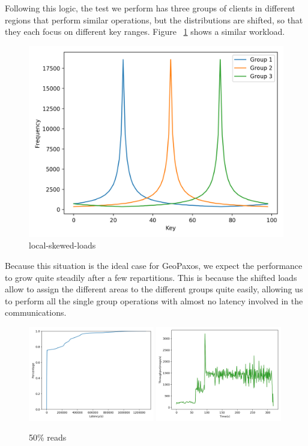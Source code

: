 Following this logic, the test we perform has three groups of clients in different regions that perform similar operations, but the distributions are shifted, so that they each focus on different key ranges. Figure ~\ref{fig:local-skewed-loads} shows a similar workload.

\begin{figure}[!htb]
  \centering
  \includegraphics[width=\textwidth,height=\textheight,keepaspectratio]{img/clients_loads.png}
  \caption[caption]{ local-skewed-loads }
  \label{fig:local-skewed-loads}
\end{figure}

Because this situation is the ideal case for GeoPaxos, we expect the performance to grow quite steadily after a few repartitions. This is because the shifted loads allow to assign the different areas to the different groups quite easily, allowing us to perform all the single group operations with almost no latency involved in the communications.

\begin{figure}[!htb]
  \centering
  \includegraphics[width=0.49\textwidth,height=\textheight,keepaspectratio]{img/local50_lat.png}
  \includegraphics[width=0.49\textwidth,height=\textheight,keepaspectratio]{img/local50_tp.png}
  \caption[caption]{ 50\% reads }
  \label{fig:local50-performance}
\end{figure}


